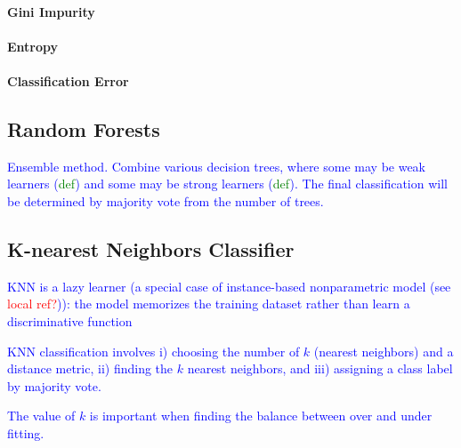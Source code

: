 \paragraph{Gini Impurity}

\paragraph{Entropy}

\paragraph{Classification Error}


\subsection{Random Forests}

\textcolor{blue}{Ensemble method. Combine various decision trees, where some may be weak learners (\textcolor{green}{def}) and some may be strong learners (\textcolor{green}{def}). The final classification will be determined by majority vote from the number of trees.}


\subsection{K-nearest Neighbors Classifier}

\textcolor{blue}{KNN is a lazy learner (a special case of instance-based nonparametric model (see \textcolor{red}{local ref?})): the model memorizes the training dataset rather than learn a discriminative function}

\textcolor{blue}{KNN classification involves i) choosing the number of $k$ (nearest neighbors) and a distance metric, ii) finding the $k$ nearest neighbors, and iii) assigning a class label by majority vote.}

\textcolor{blue}{The value of $k$ is important when finding the balance between over and under fitting.}


